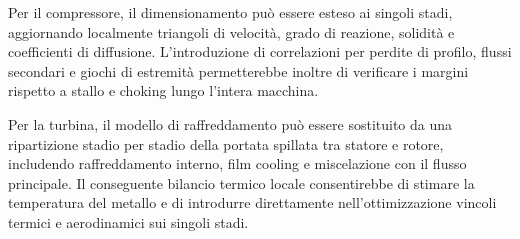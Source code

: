 Per il compressore, il dimensionamento può essere esteso ai singoli stadi, aggiornando
localmente triangoli di velocità, grado di reazione, solidità e coefficienti di diffusione.
L'introduzione di correlazioni per perdite di profilo, flussi secondari e giochi di estremità
permetterebbe inoltre di verificare i margini rispetto a stallo e choking lungo l'intera macchina.

Per la turbina, il modello di raffreddamento può essere sostituito da una ripartizione stadio
per stadio della portata spillata tra statore e rotore, includendo raffreddamento interno,
film cooling e miscelazione con il flusso principale. Il conseguente bilancio termico locale
consentirebbe di stimare la temperatura del metallo e di introdurre direttamente
nell'ottimizzazione vincoli termici e aerodinamici sui singoli stadi.